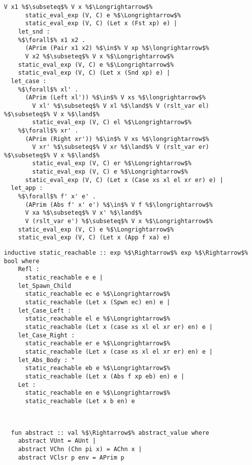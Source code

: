 \begin{lstlisting}[style=codestyle1, escapechar=\%]
        V x1 %$\subseteq$% V x %$\Longrightarrow$% 
      static_eval_exp (V, C) e %$\Longrightarrow$% 
      static_eval_exp (V, C) (Let x (Fst xp) e) |
    let_snd : 
    %$\forall$% x1 x2 .
      (APrim (Pair x1 x2) %$\in$% V xp %$\longrightarrow$%
      V x2 %$\subseteq$% V x %$\Longrightarrow$% 
    static_eval_exp (V, C) e %$\Longrightarrow$% 
    static_eval_exp (V, C) (Let x (Snd xp) e) |
  let_case :
    %$\forall$% xl' .
      (APrim (Left xl')) %$\in$% V xs %$\longrightarrow$%
        V xl' %$\subseteq$% V xl %$\land$% V (rslt_var el) %$\subseteq$% V x %$\land$%
        static_eval_exp (V, C) el %$\Longrightarrow$%
    %$\forall$% xr' .
      (APrim (Right xr')) %$\in$% V xs %$\longrightarrow$%
        V xr' %$\subseteq$% V xr %$\land$% V (rslt_var er) %$\subseteq$% V x %$\land$%
        static_eval_exp (V, C) er %$\Longrightarrow$%
        static_eval_exp (V, C) e %$\Longrightarrow$% 
      static_eval_exp (V, C) (Let x (Case xs xl el xr er) e) |
  let_app :
    %$\forall$% f' x' e' .
      (APrim (Abs f' x' e') %$\in$% V f %$\longrightarrow$%
      V xa %$\subseteq$% V x' %$\land$%
      V (rslt_var e') %$\subseteq$% V x %$\Longrightarrow$% 
    static_eval_exp (V, C) e %$\Longrightarrow$% 
    static_eval_exp (V, C) (Let x (App f xa) e)

  \end{lstlisting}



\begin{lstlisting}[style=codestyle1, escapechar=\%]
  inductive static_reachable :: exp %$\Rightarrow$% exp %$\Rightarrow$% bool where
    Refl :
      static_reachable e e | 
    let_Spawn_Child
      static_reachable ec e %$\Longrightarrow$%
      static_reachable (Let x (Spwn ec) en) e |
    let_Case_Left :
      static_reachable el e %$\Longrightarrow$%
      static_reachable (Let x (case xs xl el xr er) en) e |
    let_Case_Right :
      static_reachable er e %$\Longrightarrow$%
      static_reachable (Let x (case xs xl el xr er) en) e |
    let_Abs_Body : "
      static_reachable eb e %$\Longrightarrow$%
      static_reachable (Let x (Abs f xp eb) en) e | 
    Let :
      static_reachable en e %$\Longrightarrow$%
      static_reachable (Let x b en) e
  \end{lstlisting}


\begin{lstlisting}[style=codestyle1, escapechar=\%]


  fun abstract :: val %$\Rightarrow$% abstract_value where
    abstract VUnt = AUnt |
    abstract VChn (Chn pi x) = AChn x |
    abstract VClsr p env = APrim p

  \end{lstlisting}

